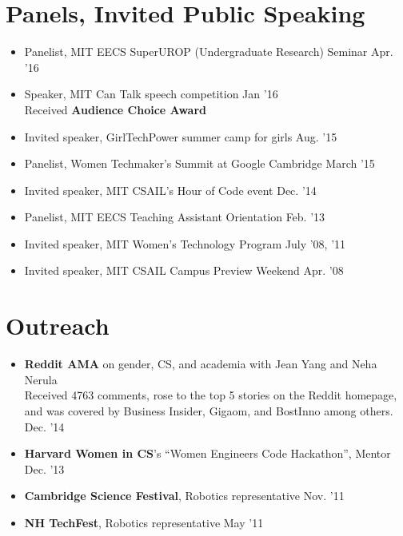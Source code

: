 \documentclass[margin]{res}
\begin{document}
\begin{resume}
\section{Panels, Invited Public Speaking}
\begin{itemize}[leftmargin=*] \itemsep -2pt 
\item Panelist, MIT EECS SuperUROP (Undergraduate Research) Seminar \hfill Apr. '16
\item Speaker, MIT Can Talk speech competition \hfill Jan '16 \\  Received {\bf Audience Choice Award}
\item Invited speaker, GirlTechPower summer camp for girls \hfill Aug. '15 
\item Panelist, Women Techmaker's Summit at Google Cambridge \hfill March '15
\item Invited speaker, MIT CSAIL's Hour of Code event \hfill Dec. '14
\item Panelist, MIT EECS Teaching Assistant Orientation \hfill Feb. '13
\item Invited speaker, MIT Women's Technology Program \hfill July '08, '11
\item Invited speaker, MIT CSAIL Campus Preview Weekend \hfill Apr. '08
\end{itemize}


\section{Outreach}
\begin{itemize}[leftmargin=*] \itemsep -2pt
\item {\bf Reddit AMA} on gender, CS, and academia with Jean Yang and Neha Nerula  \\
Received 4763 comments, rose to the top 5 stories on the Reddit homepage, and was covered by Business Insider, Gigaom, and BostInno among others. \hfill Dec. '14
\item {\bf Harvard Women in CS}'s ``Women Engineers Code Hackathon'', Mentor \hfill Dec. '13
\item {\bf Cambridge Science Festival}, Robotics representative \hfill Nov. '11
\item {\bf NH TechFest}, Robotics representative \hfill May '11

\end{itemize}


\end{resume}
\end{document}
